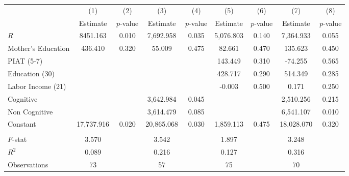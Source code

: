 \begin{tabular}{lcccccccc} \toprule
 & (1) & (2) & (3) & (4) & (5) & (6) & (7) & (8) \\ 
 & Estimate  & $p$-value  & Estimate  & $p$-value  & Estimate  & $p$-value  & Estimate  & $p$-value  \\  \midrule
$R$ &  8451.163 &     0.010 &  7,692.958 &     0.035 &  5,076.803 &     0.140 &  7,364.933 &     0.055 \\  
Mother's Education &   436.410 &     0.320 &    55.009 &     0.475 &    82.661 &     0.470 &   135.623 &     0.450 \\  
PIAT (5-7) &         &         &         &         &   143.449 &     0.310 &   -74.255 &     0.565 \\  
Education (30) &         &         &         &         &   428.717 &     0.290 &   514.349 &     0.285 \\  
Labor Income (21) &         &         &         &         &    -0.003 &     0.500 &     0.171 &     0.250 \\  
Cognitive &         &         &  3,642.984 &     0.045 &         &         &  2,510.256 &     0.215 \\  
Non Cognitive &         &         &  3,614.479 &     0.085 &         &         &  6,541.107 &     0.010 \\  
Constant & 17,737.916 &     0.020 & 20,865.068 &     0.030 &  1,859.113 &     0.475 & 18,028.070 &     0.320 \\  \\ \midrule
$F$-stat &     3.570 &         &     3.542 &         &     1.897 &         &     3.248 &         \\  
$R^2$ &     0.089 &         &     0.216 &         &     0.127 &         &     0.316 &         \\  
Observations &    73 &         &    57 &         &    75 &         &    70 &         \\  
\bottomrule \end{tabular}
